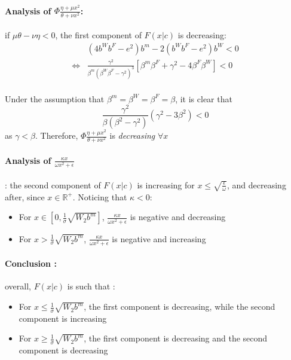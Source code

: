 \paragraph{Analysis of $\Phi \frac{\eta + \mu x^2}{\theta + \nu x^2}$:} if $\mu \theta - \nu \eta<0$, the first component of $F(x|c)$ is decreasing:
\begin{align*}
&(4b^Wb^F - e^2)b^m -2(b^Wb^F-e^2)b^W<0\\
\iff & \frac{\gamma^2}{\beta^m (\beta^W\beta^F - \gamma^2)^3}\left[ \beta^m \beta^F + \gamma^2 -4\beta^F \beta^W \right]<0\\
\end{align*}

Under the assumption that $\beta^m = \beta^W = \beta^F = \beta$, it is clear that 
$$
\frac{\gamma^2}{\beta(\beta^2 - \gamma^2)}(\gamma^2 - 3 \beta^2) <0
$$
as $\gamma < \beta$. 
Therefore, $\Phi \frac{\eta + \mu x^2}{\theta + \nu x^2}$ is \textit{decreasing} $\forall x$
\paragraph{Analysis of $\frac{\kappa x}{\omega x^2 + \epsilon}$}: the second component of $F(x|c)$ is increasing for $x \leq \sqrt{\frac{\epsilon}{\omega}}$, and decreasing after, since $x\in \mathbb{R}^+$. Noticing that $\kappa <0$: 
\begin{itemize}
    \item For $x \in \left[0,\frac{1}{\sigma}\sqrt{W_2 b^m} \right]$, $\frac{\kappa x}{\omega x^2 + \epsilon}$ is negative and decreasing
    \item For $x>\frac{1}{\sigma}\sqrt{W_2 b^m}$, $\frac{\kappa x}{\omega x^2 + \epsilon}$ is negative and increasing
\end{itemize}
%
\paragraph{Conclusion :}
overall, $F(x|c)$ is such that : 
\begin{itemize}
    \item For $x \leq \frac{1}{\sigma}\sqrt{W_2 b^m}$, the first component is decreasing, while the second component is increasing
    \item For $x \geq \frac{1}{\sigma}\sqrt{W_2 b^m}$, the first component is decreasing and the second component is decreasing
\end{itemize}

